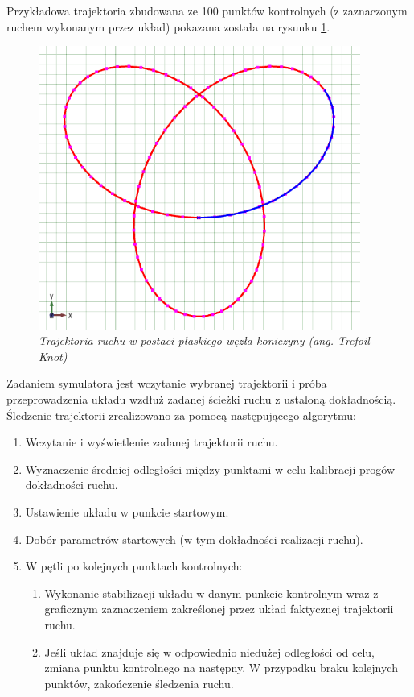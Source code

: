 \documentclass[12pt, oneside]{report}
\theoremstyle{definition}
\begin{document}
Przykładowa trajektoria zbudowana ze 100 punktów kontrolnych (z zaznaczonym ruchem wykonanym przez układ) pokazana została na rysunku \ref{TrajectoryTrefoilKnot}.

\begin{figure}[H]
	\centering
		\includegraphics[width = 300pt]{TrajectoryTrefoilKnot} 
		\caption{\textit{Trajektoria ruchu w postaci płaskiego węzła koniczyny (ang. Trefoil Knot)}}
		\label{TrajectoryTrefoilKnot}
\end{figure}

Zadaniem symulatora jest wczytanie wybranej trajektorii i próba przeprowadzenia układu wzdłuż zadanej ścieżki ruchu z ustaloną dokładnością. Śledzenie trajektorii zrealizowano za pomocą następującego algorytmu:
\begin{enumerate}
\item Wczytanie i wyświetlenie zadanej trajektorii ruchu.
\item Wyznaczenie średniej odległości między punktami w celu kalibracji progów dokładności ruchu.
\item Ustawienie układu w punkcie startowym.
\item Dobór parametrów startowych (w tym dokładności realizacji ruchu).
\item W pętli po kolejnych punktach kontrolnych:
\begin{enumerate}
\item Wykonanie stabilizacji układu w danym punkcie kontrolnym wraz z graficznym zaznaczeniem zakreślonej przez układ faktycznej trajektorii ruchu.
\item Jeśli układ znajduje się w odpowiednio niedużej odległości od celu, zmiana punktu kontrolnego na następny.
W przypadku braku kolejnych punktów, zakończenie śledzenia ruchu. 
\end{enumerate}
\end{enumerate}
\end{document}
